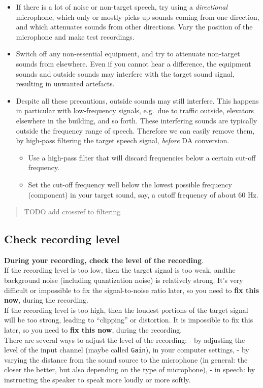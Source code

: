 \documentclass[
]{book}
\providecommand{\tightlist}{%
  \setlength{\itemsep}{0pt}\setlength{\parskip}{0pt}}
\begin{document}
\begin{itemize}
\item
  If there is a lot of noise or non-target speech, try using a \emph{directional} microphone, which only or mostly picks up sounds coming from one direction, and which attenuates sounds from other directions. Vary the position of the microphone and make test recordings.
\item
  Switch off any non-essential equipment, and try to attenuate non-target sounds from elsewhere. Even if you cannot hear a difference, the equipment sounds and outside sounds may interfere with the target sound signal, resulting in unwanted artefacts.
\item
  Despite all these precautions, outside sounds may still interfere. This happens in particular with low-frequency signals, e.g.~due to traffic outside, elevators elsewhere in the building, and so forth. These interfering sounds are typically outside the frequency range of speech. Therefore we can easily remove them, by high-pass filtering the target speech signal, \emph{before} DA conversion.

  \begin{itemize}
  \tightlist
  \item
    Use a high-pass filter that will discard frequencies below a certain cut-off frequency.
  \item
    Set the cut-off frequency well below the lowest possible frequency (component) in your target sound, say, a cutoff frequency of about 60 Hz.
  \end{itemize}
\end{itemize}

\begin{quote}
TODO add crossref to filtering
\end{quote}

\subsection{Check recording level}\label{sec:recordinglevel}

\textbf{During your recording, check the level of the recording}.\\
If the recording level is too low, then the target signal is too weak, andthe background noise (including quantization noise) is relatively strong. It's very difficult or impossible to fix the signal-to-noise ratio later, so you need to \textbf{fix this now}, during the recording.\\
If the recording level is too high, then the loudest portions of the target signal will be too strong, leading to ``clipping'' or distortion. It is impossible to fix this later, so you need to \textbf{fix this now}, during the recording.\\
There are several ways to adjust the level of the recording:
- by adjusting the level of the input channel (maybe called \texttt{Gain}), in your computer settings,
- by varying the distance from the sound source to the microphone (in general: the closer the better, but also depending on the type of microphone),
- in speech: by instructing the speaker to speak more loudly or more softly.
\end{document}
